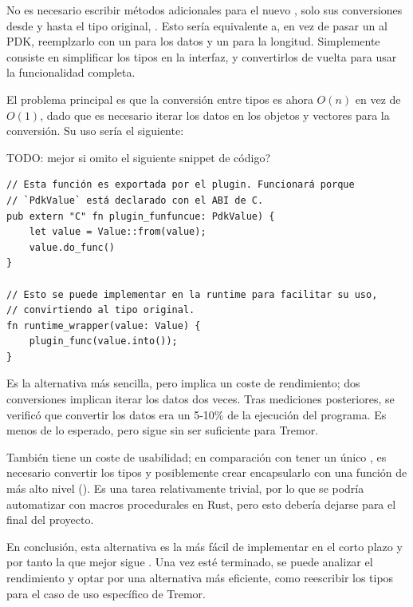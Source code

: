No es necesario escribir métodos adicionales para el nuevo , solo
sus conversiones desde y hasta el tipo original, . Esto sería
equivalente a, en vez de pasar un  al PDK, reemplzarlo con un
 para los datos y un  para la longitud. Simplemente
consiste en simplificar los tipos en la interfaz, y convertirlos de vuelta para
usar la funcionalidad completa.

El problema principal es que la conversión entre tipos es ahora $O(n)$ en vez de
$O(1)$, dado que es necesario iterar los datos en los objetos y vectores para la
conversión. Su uso sería el siguiente:

TODO: mejor si omito el siguiente snippet de código?

\begin{verbatim}
// Esta función es exportada por el plugin. Funcionará porque
// `PdkValue` está declarado con el ABI de C.
pub extern "C" fn plugin_funfuncue: PdkValue) {
    let value = Value::from(value);
    value.do_func()
}

// Esto se puede implementar en la runtime para facilitar su uso,
// convirtiendo al tipo original.
fn runtime_wrapper(value: Value) {
    plugin_func(value.into());
}
\end{verbatim}

Es la alternativa más sencilla, pero implica un coste de rendimiento; dos
conversiones implican iterar los datos dos veces. Tras mediciones posteriores,
se verificó que convertir los datos era un 5-10\% de la ejecución del programa.
Es menos de lo esperado, pero sigue sin ser suficiente para Tremor.

También tiene un coste de usabilidad; en comparación con tener un único
, es necesario convertir los tipos y posiblemente crear encapsularlo
con una función de más alto nivel (). Es una tarea
relativamente trivial, por lo que se podría automatizar con macros procedurales
en Rust, pero esto debería dejarse para el final del proyecto.

En conclusión, esta alternativa es la más fácil de implementar en el corto
plazo y por tanto la que mejor sigue \work. Una vez esté terminado, se puede
analizar el rendimiento y optar por una alternativa más eficiente, como
reescribir los tipos para el caso de uso específico de Tremor.

